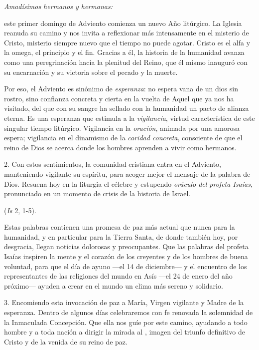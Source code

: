 \begin{body}
	\emph{Amadísimos hermanos y hermanas:} 
	
	 este primer domingo de Adviento comienza un nuevo Año litúrgico. La Iglesia reanuda su camino y nos invita a reflexionar más intensamente en el misterio de Cristo, misterio siempre nuevo que el tiempo no puede agotar. Cristo es el alfa y la omega, el principio y el fin. Gracias a él, la historia de la humanidad avanza como una peregrinación hacia la plenitud del Reino, que él mismo inauguró con su encarnación y su victoria sobre el pecado y la muerte. 
	
	Por eso, el Adviento es sinónimo de \emph{esperanza}: no espera vana de un dios sin rostro, sino confianza concreta y cierta en la vuelta de Aquel que ya nos ha visitado, del  que con su sangre ha sellado con la humanidad un pacto de alianza eterna. Es una esperanza que estimula a la \emph{vigilancia}, virtud característica de este singular tiempo litúrgico. Vigilancia en la \emph{oración}, animada por una amorosa espera; vigilancia en el dinamismo de la \emph{caridad concreta}, consciente de que el reino de Dios se acerca donde los hombres aprenden a vivir como hermanos. 
	
	2. Con estos sentimientos, la comunidad cristiana entra en el Adviento, manteniendo vigilante su espíritu, para acoger mejor el mensaje de la palabra de Dios. Resuena hoy en la liturgia el célebre y estupendo \emph{oráculo del profeta Isaías}, pronunciado en un momento de crisis de la historia de Israel. 
	
	 (\emph{Is} 2, 1-5). 
	
	Estas palabras contienen una promesa de paz más actual que nunca para la humanidad, y en particular para la Tierra Santa, de donde también hoy, por desgracia, llegan noticias dolorosas y preocupantes. Que las palabras del profeta Isaías inspiren la mente y el corazón de los creyentes y de los hombres de buena voluntad, para que el día de ayuno ---el 14 de diciembre--- y el encuentro de los representantes de las religiones del mundo en Asís ---el 24 de enero del año próximo--- ayuden a crear en el mundo un clima más sereno y solidario. 
	
	3. Encomiendo esta invocación de paz a María, Virgen vigilante y Madre de la esperanza. Dentro de algunos días celebraremos con fe renovada la solemnidad de la Inmaculada Concepción. Que ella nos guíe por este camino, ayudando a todo hombre y a toda nación a dirigir la mirada al , imagen del triunfo definitivo de Cristo y de la venida de su reino de paz.
\end{body}

